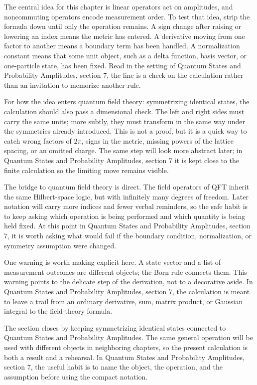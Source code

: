 The central idea for this chapter is linear operators act on amplitudes, and noncommuting operators encode measurement order.  To test that idea, strip the formula down until only the operation remains.  A sign change after raising or lowering an index means the metric has entered.  A derivative moving from one factor to another means a boundary term has been handled.  A normalization constant means that some unit object, such as a delta function, basis vector, or one-particle state, has been fixed.  Read in the setting of Quantum States and Probability Amplitudes, section 7, the line is a check on the calculation rather than an invitation to memorize another rule.

For how the idea enters quantum field theory: symmetrizing identical states, the calculation should also pass a dimensional check.  The left and right sides must carry the same units; more subtly, they must transform in the same way under the symmetries already introduced.  This is not a proof, but it is a quick way to catch wrong factors of \(2\pi\), signs in the metric, missing powers of the lattice spacing, or an omitted charge.  The same step will look more abstract later; in Quantum States and Probability Amplitudes, section 7 it is kept close to the finite calculation so the limiting move remains visible.

The bridge to quantum field theory is direct.  The field operators of QFT inherit the same Hilbert-space logic, but with infinitely many degrees of freedom.  Later notation will carry more indices and fewer verbal reminders, so the safe habit is to keep asking which operation is being performed and which quantity is being held fixed.  At this point in Quantum States and Probability Amplitudes, section 7, it is worth asking what would fail if the boundary condition, normalization, or symmetry assumption were changed.

One warning is worth making explicit here.  A state vector and a list of measurement outcomes are different objects; the Born rule connects them.  This warning points to the delicate step of the derivation, not to a decorative aside.  In Quantum States and Probability Amplitudes, section 7, the calculation is meant to leave a trail from an ordinary derivative, sum, matrix product, or Gaussian integral to the field-theory formula.

The section closes by keeping symmetrizing identical states connected to Quantum States and Probability Amplitudes.  The same general operation will be used with different objects in neighboring chapters, so the present calculation is both a result and a rehearsal.  In Quantum States and Probability Amplitudes, section 7, the useful habit is to name the object, the operation, and the assumption before using the compact notation.



